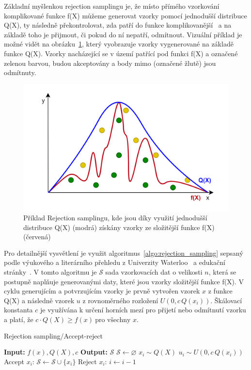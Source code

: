 Základní myšlenkou rejection samplingu je, že místo přímého vzorkování komplikované funkce f(X) můžeme generovat vzorky pomocí jednodušší distribuce Q(X), ty následně překontrolovat, zda patří do funkce komplikovanější~\cite{ghojogh2020sampling} a na základě toho je přijmout, či pokud do ní nepatří, odmítnout. Vizuální příklad je možné vidět na obrázku~\ref{fig:RA_graph}, který vyobrazuje vzorky vygenerované na základě funkce Q(X). Vzorky nacházející se v území patřící pod funkci f(X) a označené zelenou barvou, budou akceptovány a body mimo (označené žlutě) jsou odmítnuty.

\begin{figure}[H]
    \centering
    \includegraphics[width=\textwidth]{obrazky-figures/ch2/RA_graph.png}
    \caption{Příklad Rejection samplingu, kde jsou díky využití jednodušší distribuce Q(X) (modrá) získány vzorky ze složitější funkce f(X) (červená)}
    \label{fig:RA_graph}
\end{figure}

Pro detailnější vysvětlení je využit algoritmus~\ref{algo:rejection_sampling} sepsaný podle výukového a literárního přehledu z Univerzity Waterloo~\cite{ghojogh2020sampling} a edukační stránky~\cite{Sachdeva_2021}. V tomto algoritmu je $\mathcal{S}$ sada vzorkovacích dat o velikosti $n$, která se postupně naplňuje generovanými daty, které jsou vzorky složitější funkce f(X). V cyklu generujícím a potvrzujícím vzorky je prvně vytvořen vzorek $x$ z funkce Q(X) a následně vzorek $u$ z rovnoměrného rozložení $U(0, c\, Q(x_i))$. Škálovací konstanta $c$ je využívána k určení horních mezí pro přijetí nebo odmítnutí vzorku a platí, že $c \cdot Q(X) \geq f(x) \ \text{pro všechny } x$.
\label{eq:RA_c}
\begin{algorithm}[h]
\caption{Rejection sampling/Accept-reject}\label{algo:rejection_sampling}
\begin{algorithmic}[1]
    \State \textbf{Input:} $f(x), Q(X), c$\;
    \State \textbf{Output:} $\mathcal{S}$
    \State $\mathcal{S} \gets \varnothing$
        \State $x_i \sim Q(X)$
        \State $u_i \sim U(0, c\, Q(x_i))$
            \State Accept $x_i$: $\mathcal{S} \gets \mathcal{S} \cup \{x_i\}$
        \Else
            \State Reject $x_i$: $i \gets i - 1$
        \EndIf
    \EndFor
\end{algorithmic}
\end{algorithm}

